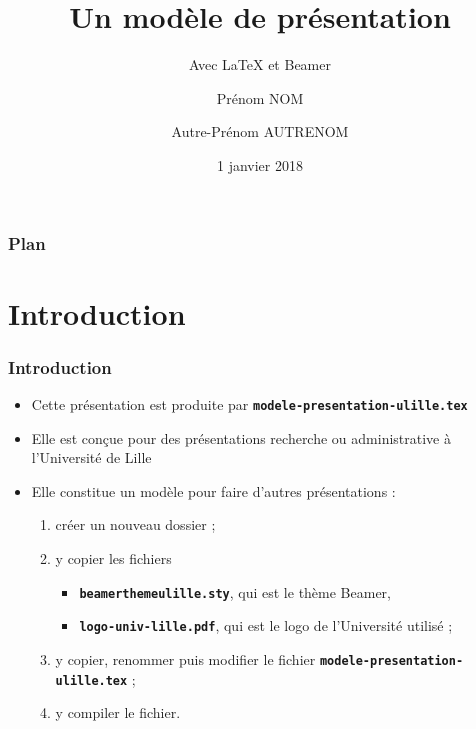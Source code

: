 \documentclass[10pt,t]{beamer}
\title{Un modèle de présentation}
\subtitle{Avec \LaTeX{} et Beamer}
\author{Prénom NOM \and Autre-Prénom AUTRENOM}
\institute{Université de Lille}
\date{1\ier{} janvier 2018}
\begin{document}
\maketitle

\begin{frame}
  \frametitle{Plan}
  \tableofcontents %
\end{frame}


\section{Introduction}


\begin{frame}%
  \frametitle{Introduction}


  \begin{itemize}
  \item Cette présentation est produite par \texttt{\textbf{modele-presentation-ulille.tex}}
  \item Elle est conçue pour des présentations recherche ou administrative à l'Université de Lille
  \end{itemize}

  \pause


  \begin{itemize}
  \item Elle constitue un modèle pour faire d'autres présentations :
    
    \begin{enumerate}
    \item créer un nouveau dossier ;
    \item y copier les fichiers 

      \begin{itemize}
      \item \texttt{\textbf{beamerthemeulille.sty}}, qui est le thème Beamer,
      \item \texttt{\textbf{logo-univ-lille.pdf}}, qui est le logo de l'Université utilisé ;
      \end{itemize}

    \item y copier, renommer puis modifier le fichier \texttt{\textbf{modele-presentation-ulille.tex}} ;
    \item y compiler le fichier.
    \end{enumerate}
  \end{itemize}
  
\end{frame}
\end{document}
